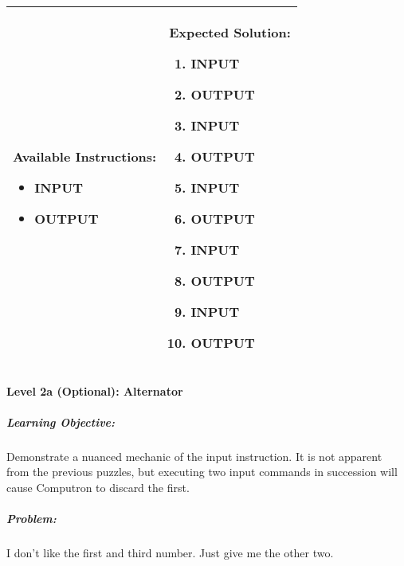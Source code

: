 \begin{center}
    \begin{tabular}{ | m{6cm} | m{8cm} | } 
        \hline
            \textbf{Available Instructions:} 
            \begin{itemize}
                \setlength\itemsep{-.35em}
                \item INPUT
                \item OUTPUT
            \end{itemize}& 
            \textbf{Expected Solution:} 
            \begin{enumerate}
                \setlength\itemsep{-.35em}
                \item INPUT
                \item OUTPUT
                \item INPUT
                \item OUTPUT
                \item INPUT
                \item OUTPUT
                \item INPUT
                \item OUTPUT
                \item INPUT
                \item OUTPUT
            \end{enumerate}
            \\
        \hline
    \end{tabular}
\end{center}


\paragraph{Level 2a (Optional): Alternator}
\subparagraph{Learning Objective:} Demonstrate a nuanced mechanic of the input instruction. It is not apparent from the previous puzzles, but executing two input commands in succession will cause Computron to discard the first.

\subparagraph{Problem:} I don't like the first and third number. Just give me the other two.

